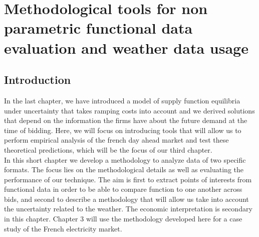 

\renewcommand{\thesection}{\arabic{chapter}.\arabic{section}}


\chapter{Methodological tools for non parametric functional data evaluation and weather data usage} 
\label{chap:ch1-5}
\cleardoublepage

\doublespacing
\section{Introduction}
In the last chapter, we have introduced a model of supply function equilibria under uncertainty that takes ramping costs into account and we derived solutions that depend on the information the firms have about the future demand at the time of bidding. Here, we will focus on introducing tools that will allow us to perform empirical analysis of the french day ahead market and test these theoretical predictions, which will be the focus of our third chapter.\\

In this short chapter we develop a methodology to analyze data of two specific formats. The focus lies on the methodological details as well as evaluating the performance of our technique. The aim is first to extract points of interests from functional data in order to be able to compare function to one another across bids, and second to describe a methodology that will allow us take into account the uncertainty related to the weather. The economic interpretation is secondary in this chapter. Chapter 3 will use the methodology developed here for a case study of the French electricity market.\\

